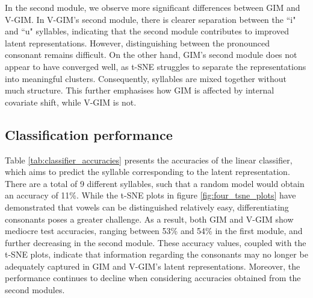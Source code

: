 	In the second module, we observe more significant differences between GIM and V-GIM. In V-GIM's second module, there is clearer separation between the ``i" and ``u" syllables, indicating that the second module contributes to improved latent representations. However, distinguishing between the pronounced consonant remains difficult. On the other hand, GIM's second module does not appear to have converged well, as t-SNE struggles to separate the representations into meaningful clusters. Consequently, syllables are mixed together without much structure. This further emphasises how GIM is affected by internal covariate shift, while V-GIM is not.
	
	
	
		
	
	\subsection{Classification performance} \label{cha:exper_classifier}
	Table \ref{tab:classifier_accuracies} presents the accuracies of the linear classifier, which aims to predict the syllable corresponding to the latent representation. There are a total of 9 different syllables, such that a random model would obtain an accuracy of 11\%. While the t-SNE plots in figure \ref{fig:four_tsne_plots} have demonstrated that vowels can be distinguished relatively easy, differentiating consonants poses a greater challenge. As a result, both GIM and V-GIM show mediocre test accuracies, ranging between 53\% and 54\% in the first module, and further decreasing in the second module. These accuracy values, coupled with the t-SNE plots, indicate that information regarding the consonants may no longer be adequately captured in GIM and V-GIM's latent representations. Moreover, the performance continues to decline when considering accuracies obtained from the second modules.
	
	
	
